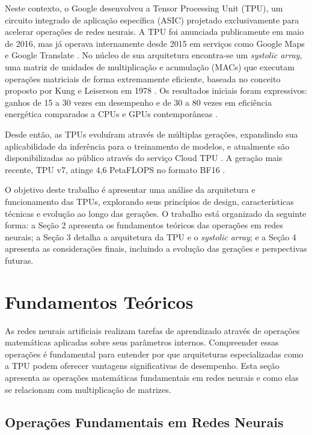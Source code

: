\documentclass[12pt,a4paper]{article}
\begin{document}
Neste contexto, o Google desenvolveu a Tensor Processing Unit (TPU), um circuito integrado de aplicação específica (ASIC) projetado exclusivamente para acelerar operações de redes neurais. A TPU foi anunciada publicamente em maio de 2016, mas já operava internamente desde 2015 em serviços como Google Maps e Google Translate \cite{wikipedia_tpu_2024}. No núcleo de sua arquitetura encontra-se um \textit{systolic array}, uma matriz de unidades de multiplicação e acumulação (MACs) que executam operações matriciais de forma extremamente eficiente, baseada no conceito proposto por Kung e Leiserson em 1978 \cite{kung_leiserson_1978}. Os resultados iniciais foram expressivos: ganhos de 15 a 30 vezes em desempenho e de 30 a 80 vezes em eficiência energética comparados a CPUs e GPUs contemporâneas \cite{jouppi_tpu_paper_2017}.

Desde então, as TPUs evoluíram através de múltiplas gerações, expandindo sua aplicabilidade da inferência para o treinamento de modelos, e atualmente são disponibilizadas ao público através do serviço Cloud TPU \cite{google_cloud_tpu}. A geração mais recente, TPU v7, atinge 4,6 PetaFLOPS no formato BF16 \cite{techplanet_tpu_2024}.

O objetivo deste trabalho é apresentar uma análise da arquitetura e funcionamento das TPUs, explorando seus princípios de design, características técnicas e evolução ao longo das gerações. O trabalho está organizado da seguinte forma: a Seção 2 apresenta os fundamentos teóricos das operações em redes neurais; a Seção 3 detalha a arquitetura da TPU e o \textit{systolic array}; e a Seção 4 apresenta as considerações finais, incluindo a evolução das gerações e perspectivas futuras.

\section{Fundamentos Teóricos}

As redes neurais artificiais realizam tarefas de aprendizado através de operações matemáticas aplicadas sobre seus parâmetros internos. Compreender essas operações é fundamental para entender por que arquiteturas especializadas como a TPU podem oferecer vantagens significativas de desempenho. Esta seção apresenta as operações matemáticas fundamentais em redes neurais e como elas se relacionam com multiplicação de matrizes.

\subsection{Operações Fundamentais em Redes Neurais}
\end{document}
